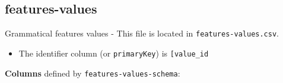 \hypertarget{features-values}{%
\subsection{\texorpdfstring{\textbf{features-values}}{features-values}}\label{features-values}}

Grammatical features values - This file is located in
\texttt{features-values.csv}.

\begin{itemize}
\tightlist
\item
  The identifier column (or \texttt{primaryKey}) is
  \texttt{{[}\textquotesingle{}value\_id\textquotesingle{}{]}}
\end{itemize}

\textbf{Columns} defined by \texttt{features-values-schema}:

